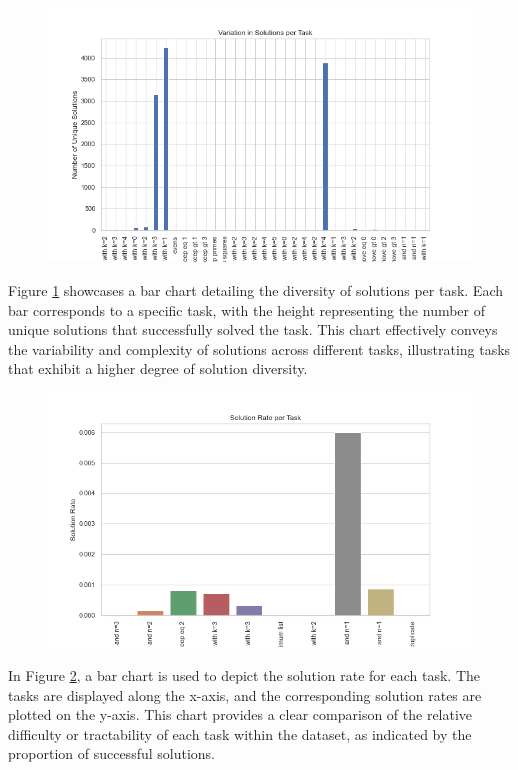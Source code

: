 \begin{figure}
    \centering
    \includegraphics[width=\textwidth]{../img/plot_solution_variations.png}
    \caption{}
    \label{fig:solution_variations}
\end{figure}
Figure \ref{fig:solution_variations} showcases a bar chart detailing the diversity of solutions per task. Each bar corresponds to a specific task, with the height representing the number of unique solutions that successfully solved the task. This chart effectively conveys the variability and complexity of solutions across different tasks, illustrating tasks that exhibit a higher degree of solution diversity.

\begin{figure}
    \centering
    \includegraphics[width=\textwidth]{../img/plot_solution_rate_per_task.png}
    \caption{}
    \label{fig:solution_rate_per_task}
\end{figure}
In Figure \ref{fig:solution_rate_per_task}, a bar chart is used to depict the solution rate for each task. The tasks are displayed along the x-axis, and the corresponding solution rates are plotted on the y-axis. This chart provides a clear comparison of the relative difficulty or tractability of each task within the dataset, as indicated by the proportion of successful solutions.



